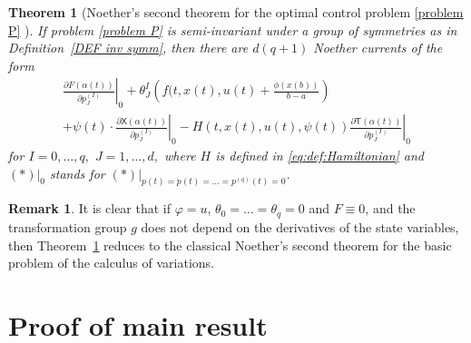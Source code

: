 \documentclass{my-aims}
\newtheorem{theorem}{Theorem}[section]
\theoremstyle{definition}
\newtheorem{remark}{Remark}
\begin{document}
\begin{theorem}[Noether's second theorem for the optimal control 
problem \eqref{problem P} \cite{Torres2003MR1980565}]
\label{thm 2_Noether OC}
If problem \eqref{problem P} is semi-invariant under a group of symmetries 
as in Definition~\ref{DEF inv symm}, then there are 
$d(q+1)$ Noether currents of the form
\begin{multline*}
\left.\frac{\partial F(\alpha(t))}{\partial p_J^{(I)}}\right|_0
+\theta_J^I\left(f(t,x(t),u(t)+\frac{\phi(x(b))}{b-a}\right) \\
+ \psi(t)\cdot \left. \frac{\partial \mathsf{X}(\alpha(t))}{\partial p_J^{(I)}}\right|_0
-\left.H(t,x(t),u(t),\psi(t))\frac{\partial \mathsf{T}(\alpha(t))}{\partial p_J^{(I)}}\right|_0
\end{multline*}
for $I=0,\dots,q,$ $J=1,\dots,d,$ where
$H$ is defined in \eqref{eq:def:Hamiltonian} and $\left.(*)\right|_0$ 
stands for $\left.(*)\right|_{p(t)=\dot{p}(t)=\dots=p^{(q)}(t)=0}$.
\end{theorem}

\begin{remark} 
It is clear that if $\varphi=u$, $\theta_0=\dots=\theta_q=0$ and $F\equiv0$, 
and the transformation group $g$ does not depend on the derivatives 
of the state variables, then Theorem~\ref{thm 2_Noether OC} reduces 
to the classical Noether's second theorem for the basic problem 
of the calculus of variations.
\end{remark}


\section{Proof of main result}
\label{sec:MainRes}
\end{document}
